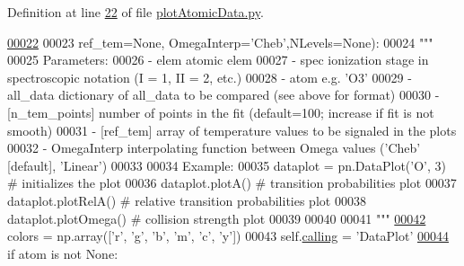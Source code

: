 Definition at line \hyperlink{plot_atomic_data_8py_source_l00022}{22} of file \hyperlink{plot_atomic_data_8py_source}{plot\-Atomic\-Data.\-py}.


\begin{DoxyCode}
\hypertarget{classpyneb_1_1plot_1_1plot_atomic_data_1_1_data_plot_l00022}{}\hyperlink{classpyneb_1_1plot_1_1plot_atomic_data_1_1_data_plot_af4b7b5510131c31e072909a6d20637c3}{00022} 
00023                  ref\_tem=\textcolor{keywordtype}{None}, OmegaInterp=\textcolor{stringliteral}{'Cheb'},NLevels=\textcolor{keywordtype}{None}):
00024         \textcolor{stringliteral}{"""}
00025 \textcolor{stringliteral}{    Parameters:}
00026 \textcolor{stringliteral}{        - elem         atomic elem }
00027 \textcolor{stringliteral}{        - spec       ionization stage in spectroscopic notation (I = 1, II = 2, etc.)}
00028 \textcolor{stringliteral}{        - atom        e.g. 'O3'}
00029 \textcolor{stringliteral}{        - all\_data       dictionary of all\_data to be compared (see above for format)}
00030 \textcolor{stringliteral}{        - [n\_tem\_points] number of points in the fit (default=100; increase if fit is not smooth)}
00031 \textcolor{stringliteral}{        - [ref\_tem]      array of temperature values to be signaled in the plots}
00032 \textcolor{stringliteral}{        - OmegaInterp    interpolating function between Omega values ('Cheb' [default], 'Linear')}
00033 \textcolor{stringliteral}{    }
00034 \textcolor{stringliteral}{    Example:}
00035 \textcolor{stringliteral}{        dataplot = pn.DataPlot('O', 3) # initializes the plot}
00036 \textcolor{stringliteral}{        dataplot.plotA() # transition probabilities plot }
00037 \textcolor{stringliteral}{        dataplot.plotRelA() # relative transition probabilities plot}
00038 \textcolor{stringliteral}{        dataplot.plotOmega() # collision strength plot    }
00039 \textcolor{stringliteral}{}
00040 \textcolor{stringliteral}{        }
00041 \textcolor{stringliteral}{        """}
\hypertarget{classpyneb_1_1plot_1_1plot_atomic_data_1_1_data_plot_l00042}{}\hyperlink{classpyneb_1_1plot_1_1plot_atomic_data_1_1_data_plot_a393a133b607541c57d5ebc5a34687e3f}{00042}         colors = np.array([\textcolor{stringliteral}{'}\textcolor{stringliteral}{r', '}g', 'b', 'm', 'c', 'y'])
00043         self.\hyperlink{classpyneb_1_1plot_1_1plot_atomic_data_1_1_data_plot_a393a133b607541c57d5ebc5a34687e3f}{calling} = \textcolor{stringliteral}{'DataPlot'}
\hypertarget{classpyneb_1_1plot_1_1plot_atomic_data_1_1_data_plot_l00044}{}\hyperlink{classpyneb_1_1plot_1_1plot_atomic_data_1_1_data_plot_af5bbbf002544d1336f7f673a6e777f2e}{00044}         \textcolor{keywordflow}{if} atom \textcolor{keywordflow}{is} \textcolor{keywordflow}{not} \textcolor{keywordtype}{None}:

\end{DoxyCode}

